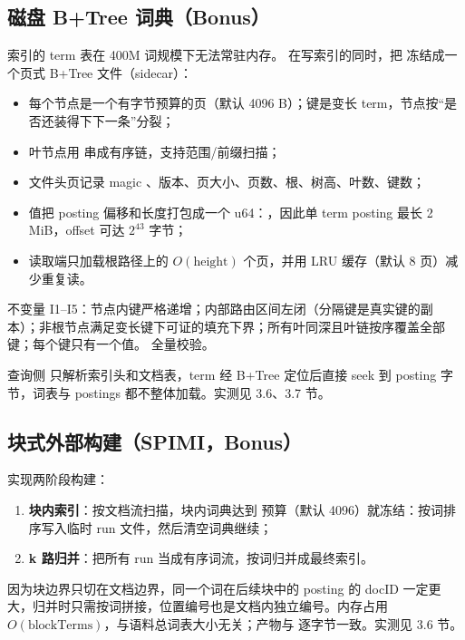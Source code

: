 \subsection{磁盘 B+Tree 词典（Bonus）}

索引的 term 表在 400M 词规模下无法常驻内存。 在写索引的同时，把  冻结成一个页式 B+Tree 文件（sidecar）：

\begin{itemize}
  \item 每个节点是一个有字节预算的页（默认 4096 B）；键是变长 term，节点按“是否还装得下下一条”分裂；
  \item 叶节点用  串成有序链，支持范围/前缀扫描；
  \item 文件头页记录 magic 、版本、页大小、页数、根、树高、叶数、键数；
  \item 值把 posting 偏移和长度打包成一个 u64：，因此单 term posting 最长 2 MiB，offset 可达 $2^{43}$ 字节；
  \item {} 读取端只加载根路径上的 $O(\text{height})$ 个页，并用 LRU 缓存（默认 8 页）减少重复读。
\end{itemize}

不变量 I1--I5：节点内键严格递增；内部路由区间左闭（分隔键是真实键的副本）；非根节点满足变长键下可证的填充下界；所有叶同深且叶链按序覆盖全部键；每个键只有一个值。 全量校验。

查询侧  只解析索引头和文档表，term 经 B+Tree 定位后直接 seek 到 posting 字节，词表与 postings 都不整体加载。实测见 3.6、3.7 节。

\subsection{块式外部构建（SPIMI，Bonus）}

 实现两阶段构建：

\begin{enumerate}
  \item \textbf{块内索引}：按文档流扫描，块内词典达到  预算（默认 4096）就冻结：按词排序写入临时 run 文件，然后清空词典继续；
  \item \textbf{k 路归并}：把所有 run 当成有序词流，按词归并成最终索引。
\end{enumerate}

因为块边界只切在文档边界，同一个词在后续块中的 posting 的 docID 一定更大，归并时只需按词拼接，位置编号也是文档内独立编号。内存占用 $O(\text{blockTerms})$，与语料总词表大小无关；产物与  逐字节一致。实测见 3.6 节。

